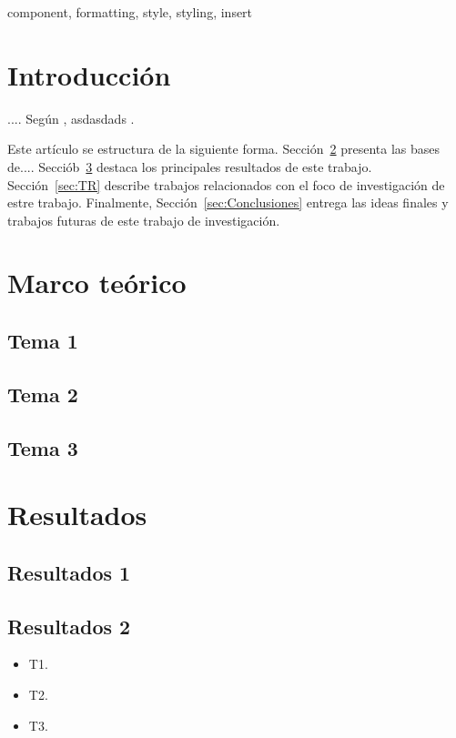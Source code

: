 \documentclass[conference]{IEEEtran}
\begin{document}
\begin{IEEEkeywords}
    component, formatting, style, styling, insert
\end{IEEEkeywords}

\section{Introducción}
....
Según  \cite{Hebert2022}, asdasdads
.

Este artículo se estructura de la siguiente forma. Sección~\ref{sec:MT} presenta las bases de.... Secciób~\ref{sec:Res} destaca los principales resultados de este trabajo. Sección~\ref{sec:TR} describe trabajos relacionados con el foco de investigación de estre trabajo. Finalmente, Sección~\ref{sec:Conclusiones} entrega las ideas finales y trabajos futuras de este trabajo de investigación.

\section{Marco teórico}
\label{sec:MT}
\subsection{Tema 1}

\subsection{Tema 2}

\subsection{Tema 3}

\section{Resultados}
\label{sec:Res}
\subsection{Resultados 1}

\subsection{Resultados 2}

\begin{itemize}
    \item T1.
    \item T2.
    \item T3.
\end{itemize}
\end{document}
